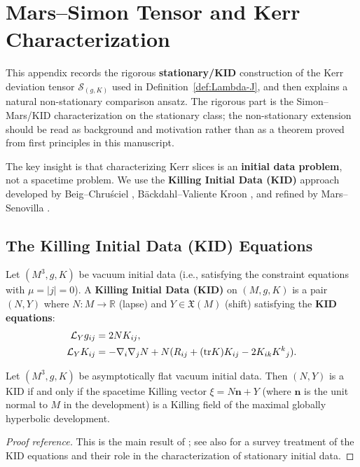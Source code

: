 \section{Mars--Simon Tensor and Kerr Characterization}\label{app:mars-simon}

This appendix records the rigorous \textbf{stationary/KID} construction of the Kerr deviation tensor $\mathcal{S}_{(g,K)}$ used in Definition~\ref{def:Lambda-J}, and then explains a natural non-stationary comparison ansatz. The rigorous part is the Simon--Mars/KID characterization on the stationary class; the non-stationary extension should be read as background and motivation rather than as a theorem proved from first principles in this manuscript.

The key insight is that characterizing Kerr slices is an \textbf{initial data problem}, not a spacetime problem. We use the \textbf{Killing Initial Data (KID)} approach developed by Beig--Chru\'sciel \cite{beigchrusciel1996}, B\"ackdahl--Valiente Kroon \cite{backdahl2010a, backdahl2010b}, and refined by Mars--Senovilla \cite{marssenovilla1993}.

\subsection{The Killing Initial Data (KID) Equations}

\begin{definition}\label{def:KID}
Let $(M^3, g, K)$ be vacuum initial data (i.e., satisfying the constraint equations with $\mu = |j| = 0$). A \textbf{Killing Initial Data (KID)} on $(M, g, K)$ is a pair $(N, Y)$ where $N: M \to \mathbb{R}$ (lapse) and $Y \in \mathfrak{X}(M)$ (shift) satisfying the \textbf{KID equations}:
\begin{align}
\mathcal{L}_Y g_{ij} &= 2NK_{ij}, \label{eq:KID1}\\
\mathcal{L}_Y K_{ij} &= -\nabla_i\nabla_j N + N(R_{ij} + (\mathrm{tr} K)K_{ij} - 2K_{ik}K^k{}_j). \label{eq:KID2}
\end{align}
\end{definition}

\begin{theorem}\label{thm:KID-spacetime}
Let $(M^3, g, K)$ be asymptotically flat vacuum initial data. Then $(N, Y)$ is a KID if and only if the spacetime Killing vector $\xi = N\mathbf{n} + Y$ (where $\mathbf{n}$ is the unit normal to $M$ in the development) is a Killing field of the maximal globally hyperbolic development.
\end{theorem}
\begin{proof}[Proof reference]
This is the main result of \cite{beigchrusciel1996}; see also \cite{chrusciel2008} for a survey treatment of the KID equations and their role in the characterization of stationary initial data.
\end{proof}

